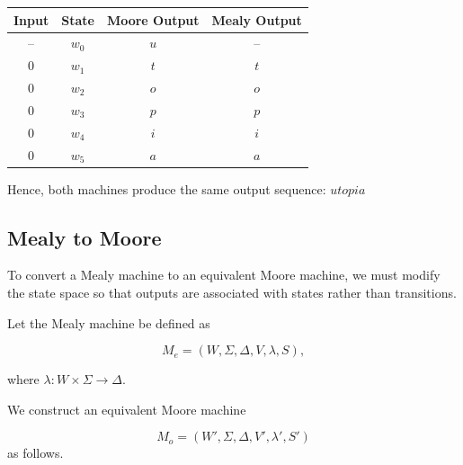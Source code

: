 \documentclass[12pt,a4paper,openany]{article}
\begin{document}
\begin{enumerate}
    \begin{center}
    \begin{tabular}{c|c|c|c}
    \textbf{Input} & \textbf{State} & \textbf{Moore Output} &  \textbf{Mealy Output} \\
    \hline
    -- & $w_0$ & $u$ &  -- \\
    $0$ & $w_1$ & $t$ &  $t$ \\
    $0$ & $w_2$ & $o$ &  $o$ \\
    $0$ & $w_3$ & $p$ &  $p$ \\
    $0$ & $w_4$ & $i$ & $i$ \\
    $0$ & $w_5$ & $a$ &  $a$ \\
    \end{tabular}
    \end{center}

    Hence, both machines produce the same output sequence: $\boxed{utopia}$

\end{enumerate}

\subsection{Mealy to Moore}


To convert a Mealy machine to an equivalent Moore machine, we must modify the
state space so that outputs are associated with states rather than transitions.

Let the Mealy machine be defined as

\[
M_{e} = (W, \Sigma, \Delta, V, \lambda, S),
\]

where \( \lambda : W \times \Sigma \to \Delta \).

We construct an equivalent Moore machine

\[
M_{o} = (W', \Sigma, \Delta, V', \lambda', S')
\]
as follows.
\end{document}
